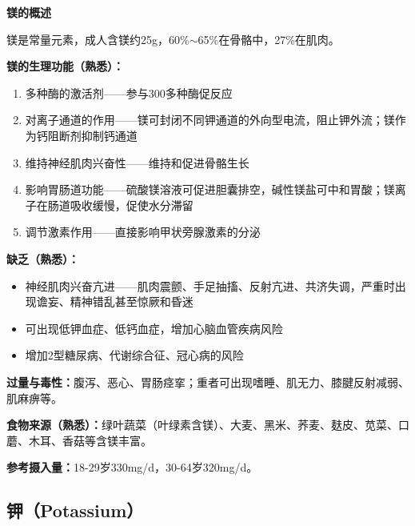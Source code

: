 \begin{tipbox}
\textbf{镁的概述}

镁是常量元素，成人含镁约25g，60\%$\sim$65\%在骨骼中，27\%在肌肉。

\textbf{镁的生理功能（熟悉）：}
\begin{enumerate}[leftmargin=*]
    \item 多种酶的激活剂——参与300多种酶促反应
    \item 对离子通道的作用——镁可封闭不同钾通道的外向型电流，阻止钾外流；镁作为钙阻断剂抑制钙通道
    \item 维持神经肌肉兴奋性——维持和促进骨骼生长
    \item 影响胃肠道功能——硫酸镁溶液可促进胆囊排空，碱性镁盐可中和胃酸；镁离子在肠道吸收缓慢，促使水分滞留
    \item 调节激素作用——直接影响甲状旁腺激素的分泌
\end{enumerate}

\textbf{缺乏（熟悉）：}
\begin{itemize}[leftmargin=*]
    \item 神经肌肉兴奋亢进——肌肉震颤、手足抽搐、反射亢进、共济失调，严重时出现谵妄、精神错乱甚至惊厥和昏迷
    \item 可出现低钾血症、低钙血症，增加心脑血管疾病风险
    \item 增加2型糖尿病、代谢综合征、冠心病的风险
\end{itemize}

\textbf{过量与毒性：}腹泻、恶心、胃肠痉挛；重者可出现嗜睡、肌无力、膝腱反射减弱、肌麻痹等。

\textbf{食物来源（熟悉）：}绿叶蔬菜（叶绿素含镁）、大麦、黑米、荞麦、麸皮、苋菜、口蘑、木耳、香菇等含镁丰富。

\textbf{参考摄入量：}18-29岁330mg/d，30-64岁320mg/d。
\end{tipbox}

\subsection{钾（Potassium）}

